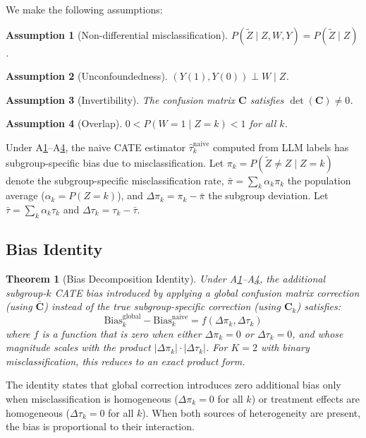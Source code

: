 \documentclass[11pt]{article}
\newtheorem{theorem}{Theorem}
\newtheorem{assumption}{Assumption}
\newcommand{\cate}{\tau}
\newcommand{\bC}{\mathbf{C}}
\newcommand{\dpi}{\Delta\pi}
\newcommand{\dtau}{\Delta\tau}
\begin{document}
We make the following assumptions:
\begin{assumption}[Non-differential misclassification]
\label{a:nondiff}
$P(\tilde{Z} \mid Z, W, Y) = P(\tilde{Z} \mid Z)$.
\end{assumption}
\begin{assumption}[Unconfoundedness]
\label{a:unconf}
$(Y(1), Y(0)) \perp W \mid Z$.
\end{assumption}
\begin{assumption}[Invertibility]
\label{a:invert}
The confusion matrix $\bC$ satisfies $\det(\bC) \neq 0$.
\end{assumption}
\begin{assumption}[Overlap]
\label{a:overlap}
$0 < P(W=1 \mid Z=k) < 1$ for all $k$.
\end{assumption}

Under A\ref{a:nondiff}--A\ref{a:overlap}, the naive CATE estimator $\hat{\cate}_k^{\mathrm{naive}}$ computed from LLM labels has subgroup-specific bias due to misclassification.
Let $\pi_k = P(\tilde{Z} \neq Z \mid Z = k)$ denote the subgroup-specific misclassification rate, $\bar{\pi} = \sum_k \alpha_k \pi_k$ the population average ($\alpha_k = P(Z=k)$), and $\dpi_k = \pi_k - \bar{\pi}$ the subgroup deviation.
Let $\bar{\cate} = \sum_k \alpha_k \cate_k$ and $\dtau_k = \cate_k - \bar{\cate}$.

\subsection{Bias Identity}

\begin{theorem}[Bias Decomposition Identity]
\label{thm:bias}
Under A\ref{a:nondiff}--A\ref{a:overlap}, the additional subgroup-$k$ CATE bias introduced by applying a global confusion matrix correction (using $\bar{\bC}$) instead of the true subgroup-specific correction (using $\bC_k$) satisfies:
\begin{equation}
\mathrm{Bias}_k^{\mathrm{global}} - \mathrm{Bias}_k^{\mathrm{naive}} = f(\dpi_k, \dtau_k)
\label{eq:bias}
\end{equation}
where $f$ is a function that is zero when either $\dpi_k = 0$ or $\dtau_k = 0$, and whose magnitude scales with the product $|\dpi_k| \cdot |\dtau_k|$.
For $K{=}2$ with binary misclassification, this reduces to an exact product form.
\end{theorem}

The identity states that global correction introduces zero additional bias only when misclassification is homogeneous ($\dpi_k = 0$ for all $k$) or treatment effects are homogeneous ($\dtau_k = 0$ for all $k$).
When both sources of heterogeneity are present, the bias is proportional to their interaction.
\end{document}

